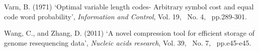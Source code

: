 \documentclass{singlecol-new}
\theoremstyle{TH}{
\newtheorem{lemma}{Lemma}
\newtheorem{theorem}[lemma]{Theorem}
\newtheorem{corrolary}[lemma]{Corrolary}
\newtheorem{conjecture}[lemma]{Conjecture}
\newtheorem{proposition}[lemma]{Proposition}
\newtheorem{claim}[lemma]{Claim}
\newtheorem{stheorem}[lemma]{Wrong Theorem}
}
\theoremstyle{THrm}{
\newtheorem{definition}{Definition}
\newtheorem{question}{Question}
\newtheorem{remark}{Remark}
\newtheorem{scheme}{Scheme}
}
\theoremstyle{THhit}{
\newtheorem{case}{Case}[section]
}
\begin{document}
\begin{thebibliography}{99}
Varn, B. (1971) `Optimal variable length codes-
Arbitrary symbol cost and equal code word
probability', {\it Information and Control}, Vol. 19,~ No. 4,~ pp.289-301.

 Wang, C., and Zhang, D. (2011) `A novel compression tool for efficient storage of genome resequencing data', {\it Nucleic acids research}, Vol. 39,~ No. 7,~ pp.e45-e45.
\end{thebibliography}


%
\end{document}
